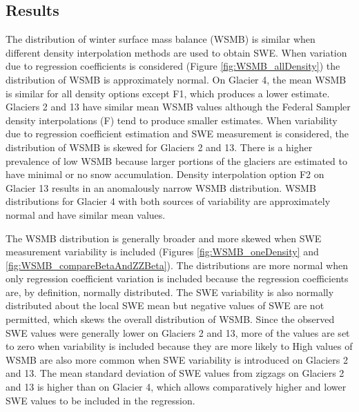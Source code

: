 \documentclass[12pt]{article}
\begin{document}
\subsection{Results}

The distribution of winter surface mass balance (WSMB) is similar when different density interpolation methods are used to obtain SWE. When variation due to regression coefficients is considered (Figure \ref{fig:WSMB_allDensity}) the distribution of WSMB is approximately normal. On Glacier 4, the mean WSMB is similar for all density options except F1, which produces a lower estimate. Glaciers 2 and 13 have similar mean WSMB values although the Federal Sampler density interpolations (F) tend to produce smaller estimates. When variability due to regression coefficient estimation and SWE measurement is considered, the distribution of WSMB is skewed for Glaciers 2 and 13. There is a higher prevalence of low WSMB because larger portions of the glaciers are estimated to have minimal or no snow accumulation. Density interpolation option F2 on Glacier 13 results in an anomalously narrow WSMB distribution. WSMB distributions for Glacier 4 with both sources of variability are approximately normal and have similar mean values. 

The WSMB distribution is generally broader and more skewed when SWE measurement variability is included (Figures \ref{fig:WSMB_oneDensity} and \ref{fig:WSMB_compareBetaAndZZBeta}). The distributions are more normal when only regression coefficient variation is included because the regression coefficients are, by definition, normally distributed. The SWE variability is also normally distributed about the local SWE mean but negative values of SWE are not permitted, which skews the overall distribution of WSMB. Since the observed SWE values were generally lower on Glaciers 2 and 13, more of the values are set to zero when variability is included because they are more likely to High values of WSMB are also more common when SWE variability is introduced on Glaciers 2 and 13. The mean standard deviation of SWE values from zigzags on Glaciers 2 and 13 is higher than on Glacier 4, which allows comparatively higher and lower SWE values to be included in the regression. 
\end{document}
